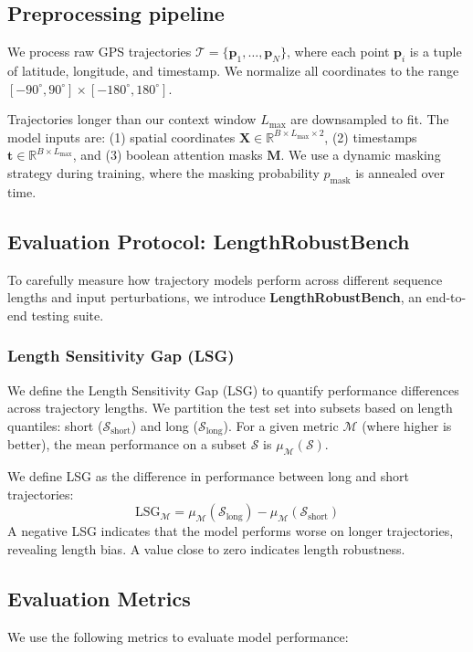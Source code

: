 \documentclass{article}
\begin{document}
\subsection{Preprocessing pipeline}
We process raw GPS trajectories $\mathcal{T} = \{\mathbf{p}_1, \dots, \mathbf{p}_N\}$, where each point $\mathbf{p}_i$ is a tuple of latitude, longitude, and timestamp. We normalize all coordinates to the range $[-90^{\circ}, 90^{\circ}] \times [-180^{\circ}, 180^{\circ}]$.

Trajectories longer than our context window $L_{\max}$ are downsampled to fit. The model inputs are: (1) spatial coordinates $\mathbf{X} \in \mathbb{R}^{B \times L_{\max} \times 2}$, (2) timestamps $\mathbf{t} \in \mathbb{R}^{B \times L_{\max}}$, and (3) boolean attention masks $\mathbf{M}$. We use a dynamic masking strategy during training, where the masking probability $p_{\mathrm{mask}}$ is annealed over time.


\subsection{Evaluation Protocol: LengthRobustBench}

To carefully measure how trajectory models perform across different sequence lengths and input perturbations, we introduce \textbf{LengthRobustBench}, an end-to-end testing suite. 

\subsubsection{Length Sensitivity Gap (LSG)}
We define the Length Sensitivity Gap (LSG) to quantify performance differences across trajectory lengths. We partition the test set into subsets based on length quantiles: short ($\mathcal{S}_{\text{short}}$) and long ($\mathcal{S}_{\text{long}}$). For a given metric $\mathcal{M}$ (where higher is better), the mean performance on a subset $\mathcal{S}$ is $\mu_{\mathcal{M}}(\mathcal{S})$.

We define LSG as the difference in performance between long and short trajectories:
\begin{equation}
\mathrm{LSG}_{\mathcal{M}} = \mu_{\mathcal{M}}(\mathcal{S}_{\text{long}}) - \mu_{\mathcal{M}}(\mathcal{S}_{\text{short}})
\end{equation}
A negative LSG indicates that the model performs worse on longer trajectories, revealing length bias. A value close to zero indicates length robustness.

\subsection{Evaluation Metrics}
We use the following metrics to evaluate model performance:
\end{document}

